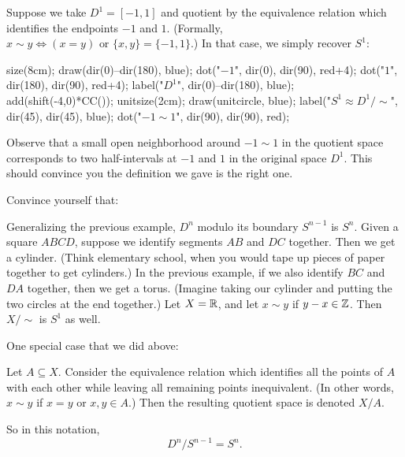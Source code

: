 \begin{example}
	Suppose we take $D^1 = [-1, 1]$
	and quotient by the equivalence relation which identifies
	the endpoints $-1$ and $1$.
	(Formally, $x \sim y \iff (x=y) \text{ or } \{x,y\} = \{-1,1\}$.)
	In that case, we simply recover $S^1$:
	\begin{center}
		\begin{asy}
			size(8cm);
			draw(dir(0)--dir(180), blue);
			dot("$-1$", dir(0), dir(90), red+4);
			dot("$1$", dir(180), dir(90), red+4);
			label("$D^1$", dir(0)--dir(180), blue);
			add(shift(-4,0)*CC());
			unitsize(2cm);
			draw(unitcircle, blue);
			label("$S^1 \approx D^1 / {\sim}$", dir(45), dir(45), blue);
			dot("$-1 \sim 1$", dir(90), dir(90), red);
		\end{asy}
	\end{center}
	Observe that a small open neighborhood around $-1 \sim 1$ in the quotient space
	corresponds to two half-intervals at $-1$ and $1$ in the original space $D^1$.
	This should convince you the definition we gave is the right one.
\end{example}

\begin{example}
	Convince yourself that:
	\begin{itemize}
		\ii Generalizing the previous example, $D^n$ modulo its boundary $S^{n-1}$ is $S^n$.
		\ii Given a square $ABCD$, suppose we identify segments $AB$ and $DC$ together.
		Then we get a cylinder. (Think elementary school, when you would tape
		up pieces of paper together to get cylinders.)
		\ii In the previous example, if we also identify $BC$ and $DA$ together,
		then we get a torus. (Imagine taking our cylinder and putting the two
		circles at the end together.)
		\ii Let $X = \mathbb R$, and let $x \sim y$ if $y -x \in \mathbb Z$.
		Then $X / {\sim}$ is $S^1$ as well.
	\end{itemize}
\end{example}

One special case that we did above:
\begin{definition}
	Let $A \subseteq X$.
	Consider the equivalence relation which identifies
	all the points of $A$ with each other
	while leaving all remaining points inequivalent.
	(In other words, $x \sim y$ if $x=y$ or $x,y \in A$.)
	Then the resulting quotient space is denoted $X/A$.
\end{definition}

So in this notation, \[ D^n / S^{n-1} = S^n. \]

